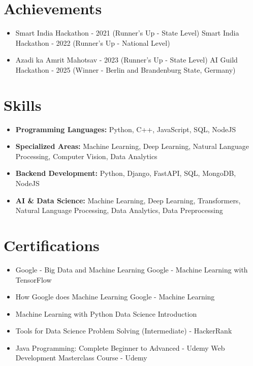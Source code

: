 \documentclass[a4paper,10pt]{article}
\begin{document}
\section*{Achievements}
\begin{itemize}
\item Smart India Hackathon - 2021 (Runner's Up - State Level) \hfill Smart India Hackathon - 2022 (Runner's Up - National Level)
\item Azadi ka Amrit Mahotsav - 2023 (Runner's Up - State Level) \hfill AI Guild Hackathon - 2025 (Winner - Berlin and Brandenburg State, Germany)
\end{itemize}

\section*{Skills}
\begin{itemize}
  \item \textbf{Programming Languages:} Python, C++, JavaScript, SQL, NodeJS
  \item \textbf{Specialized Areas:} Machine Learning, Deep Learning, Natural Language Processing, Computer Vision, Data Analytics
  \item \textbf{Backend Development:} Python, Django, FastAPI, SQL, MongoDB, NodeJS
  \item \textbf{AI \& Data Science:} Machine Learning, Deep Learning, Transformers, Natural Language Processing, Data Analytics, Data Preprocessing
\end{itemize}

\section*{Certifications}
\begin{itemize}
\item Google - Big Data and Machine Learning \hfill Google - Machine Learning with TensorFlow
\item How Google does Machine Learning \hfill Google - Machine Learning
\item Machine Learning with Python \hfill Data Science Introduction
\item Tools for Data Science \hfill Problem Solving (Intermediate) - HackerRank
\item Java Programming: Complete Beginner to Advanced - Udemy \hfill Web Development Masterclass Course - Udemy
\end{itemize}
\end{document}
